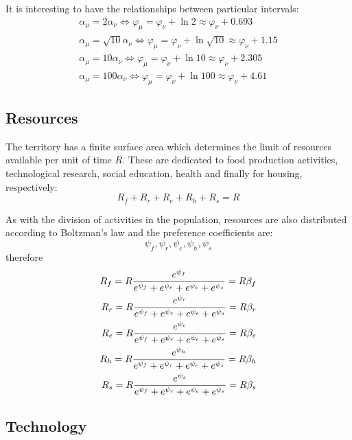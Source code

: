 \documentclass[a4paper,twoside]{article}
\begin{document}
It is interesting to have the relationships between particular intervals:
\begin{align*}
	\alpha_\mu = 2 \alpha_\nu \Leftrightarrow \varphi_\mu = \varphi_\nu + \ln 2 \approx \varphi_\nu + 0.693
	\\
	\alpha_\mu = \sqrt{10} \alpha_\nu \Leftrightarrow \varphi_\mu = \varphi_\nu + \ln\sqrt{10} \approx \varphi_\nu + 1.15
	\\
	\alpha_\mu = 10 \alpha_\nu \Leftrightarrow \varphi_\mu = \varphi_\nu + \ln 10 \approx \varphi_\nu + 2.305
	\\
	\alpha_\mu = 100 \alpha_\nu \Leftrightarrow \varphi_\mu = \varphi_\nu + \ln 100 \approx \varphi_\nu + 4.61
\end{align*}


\subsection{Resources}

The territory has a finite surface area which determines the limit of resources available per unit of time $ R $.
These are dedicated to food production activities, technological research, social education, health and finally for housing, respectively:
\begin{equation*}
	R_f + R_r + R_e + R_h + R_s = R
\end{equation*}

As with the division of activities in the population, resources are also distributed according to Boltzman's law and the preference coefficients are:
\begin{equation*}
	\psi_f, \psi_r, \psi_e, \psi_h, \psi_s
\end{equation*}
therefore
\begin{eqnarray}{\label{eq:res}}
	R_f = R \frac{e^{\psi_f}}{e^{\psi_f}+e^{\psi_r}+e^{\psi_e}+e^{\psi_s}} = R \beta_f
	\\
	R_r = R \frac{e^{\psi_r}}{e^{\psi_f}+e^{\psi_r}+e^{\psi_e}+e^{\psi_s}} = R \beta_r
	\\
	R_e = R \frac{e^{\psi_e}}{e^{\psi_f}+e^{\psi_r}+e^{\psi_e}+e^{\psi_s}} = R \beta_e
	\\
	R_h = R \frac{e^{\psi_h}}{e^{\psi_f}+e^{\psi_r}+e^{\psi_e}+e^{\psi_s}} = R \beta_h
	\\
	R_s = R \frac{e^{\psi_s}}{e^{\psi_f}+e^{\psi_r}+e^{\psi_e}+e^{\psi_s}} = R \beta_s
\end{eqnarray}


\subsection{Technology}
\end{document}
